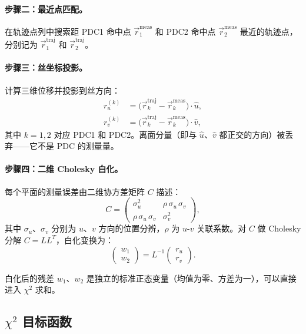 \documentclass[a4paper, 11pt]{article}
\begin{document}
\paragraph{步骤二：最近点匹配。}
在轨迹点列中搜索距 PDC1 命中点 $\vec{r}_1^\mathrm{meas}$ 和 PDC2 命中点 $\vec{r}_2^\mathrm{meas}$ 最近的轨迹点，分别记为 $\vec{r}_1^\mathrm{traj}$ 和 $\vec{r}_2^\mathrm{traj}$。

\paragraph{步骤三：丝坐标投影。}
计算三维位移并投影到丝方向：
\begin{align}
  r_u^{(k)} &= \bigl(\vec{r}_k^\mathrm{traj} - \vec{r}_k^\mathrm{meas}\bigr) \cdot \hat{u}, \label{eq:res_u} \\
  r_v^{(k)} &= \bigl(\vec{r}_k^\mathrm{traj} - \vec{r}_k^\mathrm{meas}\bigr) \cdot \hat{v}, \label{eq:res_v}
\end{align}
其中 $k = 1, 2$ 对应 PDC1 和 PDC2。离面分量（即与 $\hat{u}$、$\hat{v}$ 都正交的方向）被丢弃——它不是 PDC 的测量量。

\paragraph{步骤四：二维 Cholesky 白化。}
每个平面的测量误差由二维协方差矩阵 $C$ 描述：
\begin{equation}
  C = \begin{pmatrix}
    \sigma_u^2 & \rho\,\sigma_u\,\sigma_v \\
    \rho\,\sigma_u\,\sigma_v & \sigma_v^2
  \end{pmatrix},
  \label{eq:cov_matrix}
\end{equation}
其中 $\sigma_u$、$\sigma_v$ 分别为 $u$、$v$ 方向的位置分辨，$\rho$ 为 $u$-$v$ 关联系数。对 $C$ 做 Cholesky 分解 $C = LL^T$，白化变换为：
\begin{equation}
  \begin{pmatrix} w_1 \\ w_2 \end{pmatrix}
  = L^{-1}
  \begin{pmatrix} r_u \\ r_v \end{pmatrix}.
  \label{eq:whitening}
\end{equation}

白化后的残差 $w_1$、$w_2$ 是独立的标准正态变量（均值为零、方差为一），可以直接进入 $\chi^2$ 求和。

\subsection{$\chi^2$ 目标函数}
\end{document}

